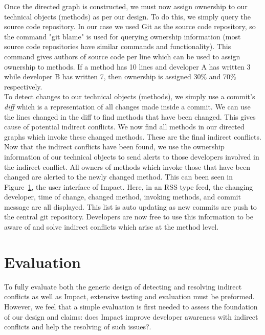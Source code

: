 \documentclass[conference]{IEEEtran}
\begin{document}
Once the directed graph is constructed, we must now assign
ownership to our technical objects (methods) as per our design.
To do this, we simply query the source code repository. In our case
we used Git as the source code repository, so the command "git blame"
is used for querying ownership information (most source code 
repositories have similar commands and functionality). This command 
gives authors of source code per line which can be used to assign
ownership to methods. If a method has 10 lines and developer A
has written 3 while developer B has written 7, then ownership is
assigned 30\% and 70\% respectively.\\

To detect changes to our technical objects (methods), we simply 
use a commit's \textit{diff} which is a representation of all changes
made inside a commit. We can use the lines changed in the diff to 
find methods that have been changed. This gives cause of potential
indirect conflicts. We now find all methods in our directed graphs
which invoke these changed methods. These are the final indirect
conflicts.\\

Now that the indirect conflicts have been found, we use the
ownership information of our technical objects to send alerts to
those developers involved in the indirect conflict. All owners
of methods which invoke those that have been changed are alerted
to the newly changed method. This can been seen in
Figure~\ref{}, the user interface of Impact. Here, in an RSS type
feed, the changing developer, time of change, changed method,
invoking methods, and commit message are all displayed. This 
list is auto updating as new commits are push to the central
git repository. Developers are now free to use this information
to be aware of and solve indirect conflicts which arise at the
method level.\\


\section{Evaluation}
To fully evaluate both the generic design of detecting and resolving
indirect conflicts as well as Impact, extensive testing and evaluation
must be preformed. However, we feel that a simple evaluation is
first needed to assess the foundation of our design and claims:
does Impact improve developer awareness with indirect conflicts
and help the resolving of such issues?.\\
\end{document}
